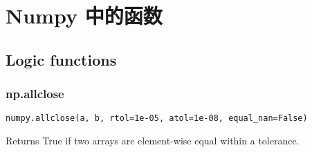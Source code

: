 \chapter{Numpy 中的函数}

\section{Logic functions}
\subsection{np.allclose\label{np.allclose}}
\verb|numpy.allclose(a, b, rtol=1e-05, atol=1e-08, equal_nan=False)|

Returns True if two arrays are element-wise equal within a tolerance.
